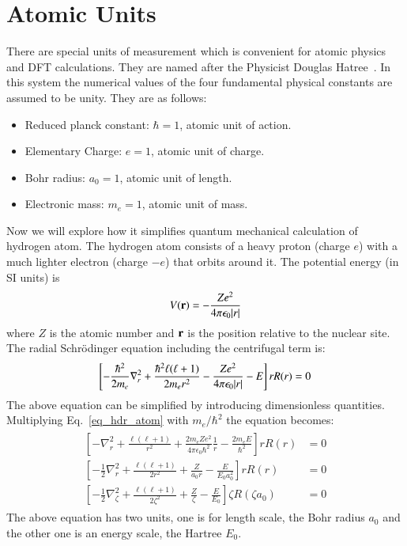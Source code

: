 \chapter{Atomic Units}\label{appen_atomicunit}
There are special units of measurement which is convenient for atomic physics and DFT calculations. They are named after the Physicist Douglas Hatree~\cite{hartree}. In this system the numerical values of the four fundamental physical constants are assumed to be unity. They are as follows:
\begin{itemize}
\item Reduced planck constant: $\hbar = 1$, atomic unit of action.
\item Elementary Charge: $e = 1$, atomic unit of charge.
\item Bohr radius: $a_0 = 1$, atomic unit of length.
\item Electronic mass: $m_e = 1$, atomic unit of mass.
\end{itemize}
Now we will explore how it simplifies quantum mechanical calculation of hydrogen atom. The hydrogen atom consists of a heavy proton (charge $e$) with a much lighter electron (charge $-e$) that orbits around it. The potential energy (in SI units) is
\begin{equation}\label{eq_hyd_pot}
V(\vb{r}) = -\frac{Ze^2}{4\pi \epsilon_0 \abs{r}}
\end{equation}
where $Z$ is the atomic number and $\vb{r}$ is the position relative to the nuclear site. The radial Schr\"odinger equation including the centrifugal term is:
\begin{equation}\label{eq_hdr_atom}
	\left [ -\frac{\hbar^2}{2m_e}\nabla_r^2 + \frac{\hbar^2 \ell (\ell+1)}{2m_er^2} - \frac{Ze^2}{4\pi \epsilon_0 \abs{r}} - E \right ]rR(r) = 0
\end{equation}
The above equation can be simplified by introducing dimensionless quantities. Multiplying Eq.~\eqref{eq_hdr_atom} with $m_e/\hbar^2$ the equation becomes:
\begin{align}
\begin{split}
\left [-\nabla^2_r + \frac{\ell(\ell+1)}{r^2} + \frac{2m_eZe^2}{4\pi\epsilon_0\hbar^2} \frac{1}{r} - \frac{2m_eE}{\hbar^2} \right ] rR(r) & = 0 \\
\left [ -\frac{1}{2} \nabla_r^2 + \frac{\ell(\ell+1)}{2r^2} + \frac{Z}{a_0r} - \frac{E}{E_0a_0^2}    \right ]rR(r) & = 0 \\
\left [-\frac{1}{2}\nabla_{\zeta}^2 + \frac{\ell(\ell+1)}{2\zeta^2} + \frac{Z}{\zeta} - \frac{E}{E_0}    \right ] \zeta R(\zeta a_0) & = 0
\end{split}
\end{align} 
The above equation has two units, one is for length scale, the Bohr radius $a_0$ and the other one is an energy scale, the Hartree $E_0$.
